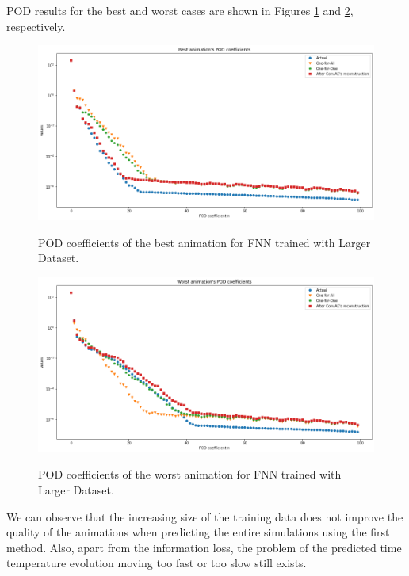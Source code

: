 POD results for the best and worst cases are shown in Figures \ref{figure:FNN_larger_best_POD} and \ref{figure:FNN_larger_worst_POD}, respectively.

\begin{figure}[H]
    \centering
    \caption{POD coefficients of the best animation for FNN trained with Larger Dataset.}
    \includegraphics[scale=0.4]{figures/mantle_convection_images/larger_dataset/FNN_Best_POD.png}
    \label{figure:FNN_larger_best_POD}
\end{figure}

\begin{figure}[H]
    \centering
    \caption{POD coefficients of the worst animation for FNN trained with Larger Dataset.}
    \includegraphics[scale=0.4]{figures/mantle_convection_images/larger_dataset/FNN_Worst_POD.png}
    \label{figure:FNN_larger_worst_POD}
\end{figure}

We can observe that the increasing size of the training data does not improve the quality of the animations when predicting the entire simulations using the first method. Also, apart from the information loss, the problem of the predicted time temperature evolution moving too fast or too slow still exists.


